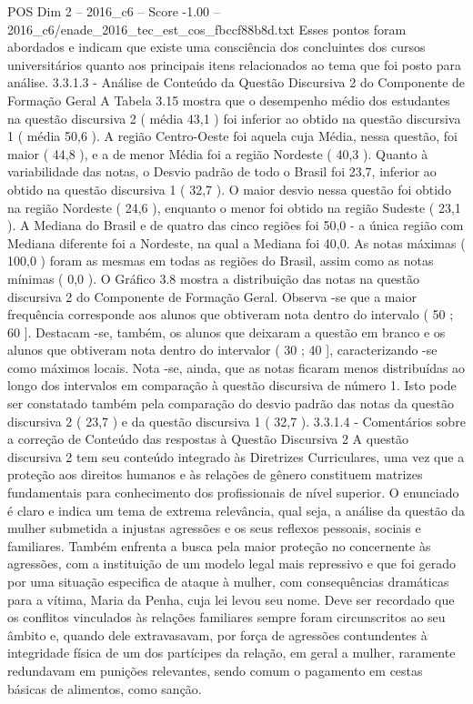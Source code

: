 \begin{textsample}{POS Dim 2 – 2016\_c6 – Score -1.00 – 2016\_c6/enade\_2016\_tec\_est\_cos\_fbccf88b8d.txt}
Esses pontos foram abordados e indicam que existe uma consciência dos concluintes dos cursos universitários quanto aos principais itens relacionados ao tema que foi posto para análise. 3.3.1.3 - Análise de Conteúdo da Questão Discursiva 2 do Componente de Formação Geral A Tabela 3.15 mostra que o desempenho médio dos estudantes na questão discursiva 2 ( média 43,1 ) foi inferior ao obtido na questão discursiva 1 ( média 50,6 ).
A região Centro-Oeste foi aquela cuja Média, nessa questão, foi maior ( 44,8 ), e a de menor Média foi a região Nordeste ( 40,3 ).
Quanto à variabilidade das notas, o Desvio padrão de todo o Brasil foi 23,7, inferior ao obtido na questão discursiva 1 ( 32,7 ).
O maior desvio nessa questão foi obtido na região Nordeste ( 24,6 ), enquanto o menor foi obtido na região Sudeste ( 23,1 ).
A Mediana do Brasil e de quatro das cinco regiões foi 50,0 - a única região com Mediana diferente foi a Nordeste, na qual a Mediana foi 40,0.
As notas máximas ( 100,0 ) foram as mesmas em todas as regiões do Brasil, assim como as notas mínimas ( 0,0 ).
O Gráfico 3.8 mostra a distribuição das notas na questão discursiva 2 do Componente de Formação Geral.
Observa -se que a maior frequência corresponde aos alunos que obtiveram nota dentro do intervalo ( 50 ; 60 ].
Destacam -se, também, os alunos que deixaram a questão em branco e os alunos que obtiveram nota dentro do intervalor ( 30 ; 40 ], caracterizando -se como máximos locais.
Nota -se, ainda, que as notas ficaram menos distribuídas ao longo dos intervalos em comparação à questão discursiva de número 1.
Isto pode ser constatado também pela comparação do desvio padrão das notas da questão discursiva 2 ( 23,7 ) e da questão discursiva 1 ( 32,7 ). 3.3.1.4 - Comentários sobre a correção de Conteúdo das respostas à Questão Discursiva 2 A questão discursiva 2 tem seu conteúdo integrado às Diretrizes Curriculares, uma vez que a proteção aos direitos humanos e às relações de gênero constituem matrizes fundamentais para conhecimento dos profissionais de nível superior.
O enunciado é claro e indica um tema de extrema relevância, qual seja, a análise da questão da mulher submetida a injustas agressões e os seus reflexos pessoais, sociais e familiares.
Também enfrenta a busca pela maior proteção no concernente às agressões, com a instituição de um modelo legal mais repressivo e que foi gerado por uma situação especifica de ataque à mulher, com consequências dramáticas para a vítima, Maria da Penha, cuja lei levou seu nome.
Deve ser recordado que os conflitos vinculados às relações familiares sempre foram circunscritos ao seu âmbito e, quando dele extravasavam, por força de agressões contundentes à integridade física de um dos partícipes da relação, em geral a mulher, raramente redundavam em punições relevantes, sendo comum o pagamento em cestas básicas de alimentos, como sanção.

\end{textsample}
